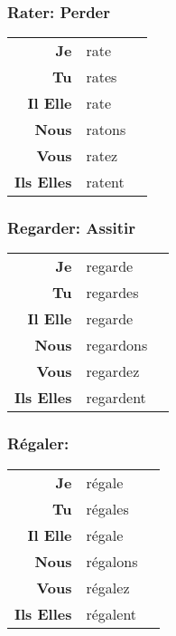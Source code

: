 \documentclass{subfiles}
\begin{document}
\begin{multicols*}{3}
        \subsubsection{Rater: Perder}
            \begin{tabular}{r l r}
                \textbf{Je}        & rate   &\\
                \textbf{Tu}        & rates  &\\
                \textbf{Il Elle}   & rate   &\\
                \textbf{Nous}      & ratons &\\
                \textbf{Vous}      & ratez  &\\
                \textbf{Ils Elles} & ratent &
            \end{tabular}

        \subsubsection{Regarder: Assitir}
            \begin{tabular}{r l r}
                \textbf{Je}        & regarde   &\\
                \textbf{Tu}        & regardes  &\\
                \textbf{Il Elle}   & regarde   &\\
                \textbf{Nous}      & regardons &\\
                \textbf{Vous}      & regardez  &\\
                \textbf{Ils Elles} & regardent &
            \end{tabular}

        \subsubsection{Régaler: }
            \begin{tabular}{r l r}
                \textbf{Je}        & régale   &\\
                \textbf{Tu}        & régales  &\\
                \textbf{Il Elle}   & régale   &\\
                \textbf{Nous}      & régalons &\\
                \textbf{Vous}      & régalez  &\\
                \textbf{Ils Elles} & régalent &
            \end{tabular}


\end{multicols*}
\end{document}
